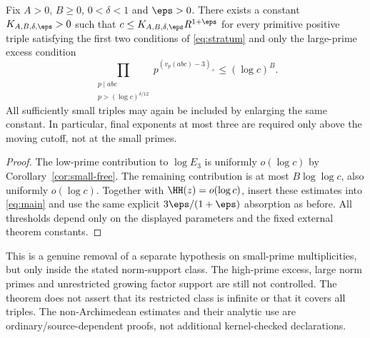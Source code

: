 \begin{theorem}\label{thm:large-prime-stratum}
Fix $A>0$, $B\ge0$, $0<\delta<1$ and $\eps>0$. There exists a constant $K_{A,B,\delta,\eps}>0$ such that $c\le K_{A,B,\delta,\eps}R^{1+\eps}$ for every primitive positive triple satisfying the first two conditions of \eqref{eq:stratum} and only the large-prime excess condition
\[
 \prod_{\substack{p\mid abc\\p>(\log c)^{\delta/12}}}
        p^{(v_p(abc)-3)_+}\le(\log c)^B.
\]
All sufficiently small triples may again be included by enlarging the same constant. In particular, final exponents at most three are required only above the moving cutoff, not at the small primes.
\end{theorem}
\begin{proof}
The low-prime contribution to $\log E_3$ is uniformly $o(\log c)$ by Corollary~\ref{cor:small-free}. The remaining contribution is at most $B\log\log c$, also uniformly $o(\log c)$. Together with $\HH(z)=o(\log c)$, insert these estimates into \eqref{eq:main} and use the same explicit $3\eps/(1+\eps)$ absorption as before. All thresholds depend only on the displayed parameters and the fixed external theorem constants.
\end{proof}

This is a genuine removal of a separate hypothesis on small-prime multiplicities, but only inside the stated norm-support class. The high-prime excess, large norm primes and unrestricted growing factor support are still not controlled. The theorem does not assert that its restricted class is infinite or that it covers all triples. The non-Archimedean estimates and their analytic use are ordinary/source-dependent proofs, not additional kernel-checked declarations.
